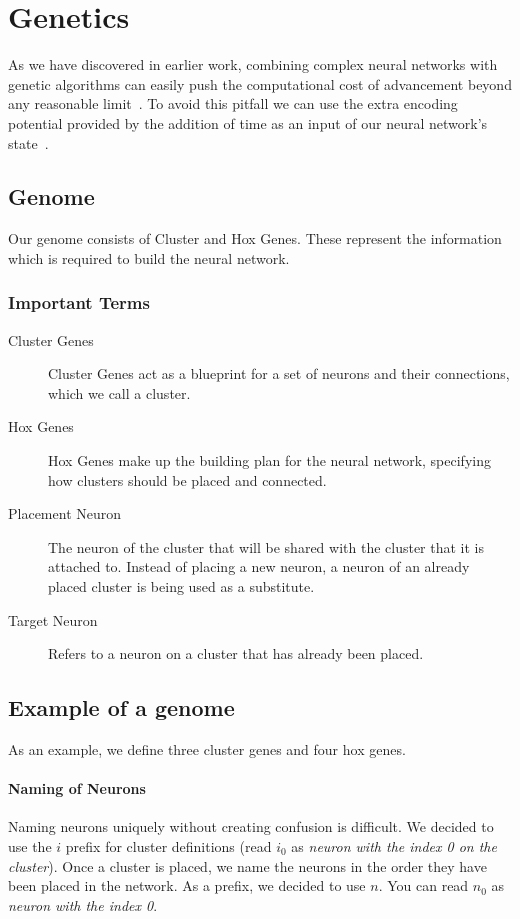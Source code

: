 \section{Genetics}

As we have discovered in earlier work, combining complex neural networks 
with genetic algorithms can easily push the computational cost of advancement
beyond any reasonable limit~\cite{Ferner2017}.
To avoid this pitfall we can use the extra encoding potential provided by 
the addition of time as an input of our neural network's state~\cite{Paugam-Moisy2012}.

\subsection{Genome}
Our genome consists of Cluster and Hox Genes.
These represent the information which is required to build the neural network.

\subsubsection{Important Terms}
\begin{description}
    \item[Cluster Genes] Cluster Genes act as a blueprint for a set of neurons and their connections, which we call a cluster.
    \item[Hox Genes] Hox Genes make up the building plan for the neural network,
    specifying how clusters should be placed and connected.
    \item[Placement Neuron] The neuron of the cluster that will be shared with the cluster that it is attached to. Instead of placing a new neuron, a neuron of an already placed cluster is being used as a substitute.
    \item[Target Neuron] Refers to a neuron on a cluster that has already been placed.
\end{description}

\label{Example of a genome}
\subsection{Example of a genome}
As an example, we define three cluster genes and four hox genes.

\paragraph{Naming of Neurons}
Naming neurons uniquely without creating confusion is difficult. We decided to use the $i$ prefix for cluster definitions (read $i_0$ as \emph{neuron with the index 0 on the cluster}).
Once a cluster is placed, we name the neurons in the order they have been placed in the network. As a prefix, we decided to use $n$. You can read $n_0$ as \emph{neuron with the index 0}.

